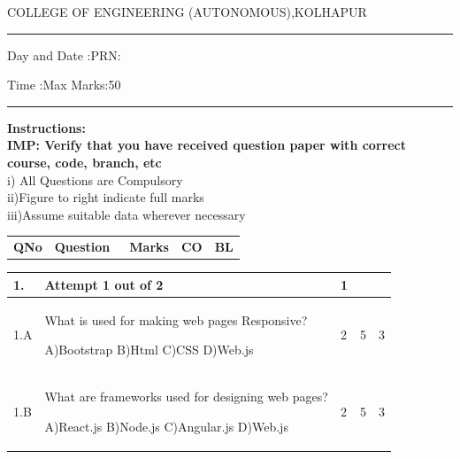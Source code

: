 \documentclass[12pt]{article}
\begin{document}
	\par
	COLLEGE OF ENGINEERING (AUTONOMOUS),KOLHAPUR
	\par\noindent\rule{\textwidth}{0.4pt}
	
	\centering{}\par
	\centering{}\par
	\par
	\begin{flushleft}
		Day and Date :{}\hspace{5.5cm}PRN:
	\end{flushleft}
	
	\begin{flushleft}
		Time :{}\hspace{3cm}Max Marks:{50}\\
	\end{flushleft}
	\noindent\rule{\textwidth}{0.1pt}
\begin{flushleft}
	{\bf Instructions:}\\
	{\hspace{0.5cm} \bf IMP: Verify that you have received question paper with correct course, code, branch, etc}\\
	\hspace{1cm}i) All Questions are Compulsory\\
	\hspace{1cm}ii)Figure to right indicate full marks\\
	\hspace{1cm}iii)Assume suitable data wherever necessary\\
\end{flushleft}

\begin{tabular}{L{1cm}C{9cm}C{2cm}C{2cm}C{1cm}}
	\bf{QNo} & 
	\bf{Question}\
	
	&
	\bf{Marks}&
	\bf{CO}&
	\bf{BL}
	
	
	
	
\end{tabular} 
	\begin{tabular}{|L{1cm}|L{9cm}|C{2cm}|C{2cm}|C{1cm}|}
		1. & Attempt 1 out of 2 & 1  & & \\ \hline
				1.A & What is used for making web pages Responsive? \newline
					
		A)Bootstrap\newline
		B)Html\newline
		C)CSS\newline
		D)Web.js &
		2 &
		5&
		3 \\ \hline
		
				1.B & What are frameworks used for designing web pages? \newline
					
		A)React.js\newline
		B)Node.js\newline
		C)Angular.js\newline
		D)Web.js &
		2 &
		5&
		3 \\ \hline
		
		
	\end{tabular}
\end{document}
